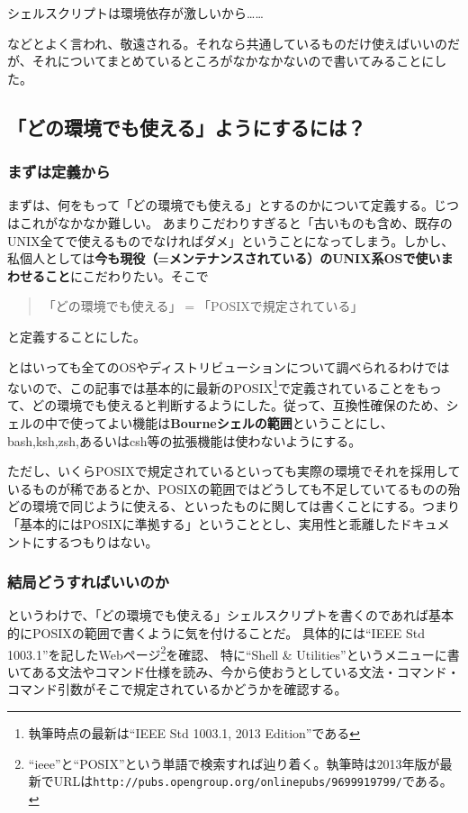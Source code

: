 \noindent
$\!\!\!\!\!$
\begin{grshfboxit}{160.0mm}
	シェルスクリプトは環境依存が激しいから……
\end{grshfboxit}

\noindent
などとよく言われ、敬遠される。それなら共通しているものだけ使えばいいのだが、それについてまとめているところがなかなかないので書いてみることにした。

\subsection*{「どの環境でも使える」ようにするには？}

\subsubsection*{まずは定義から}

まずは、何をもって「どの環境でも使える」とするのかについて定義する。じつはこれがなかなか難しい。
あまりこだわりすぎると「古いものも含め、既存のUNIX全てで使えるものでなければダメ」ということになってしまう。しかし、私個人としては\textbf{今も現役（=メンテナンスされている）のUNIX系OSで使いまわせること}にこだわりたい。そこで

\begin{quote}
  「どの環境でも使える」$=$「POSIXで規定されている」
\end{quote}

\noindent
と定義することにした。

とはいっても全てのOSやディストリビューションについて調べられるわけではないので、この記事では基本的に最新のPOSIX\footnote{執筆時点の最新は``IEEE Std 1003.1, 2013 Edition''である}で定義されていることをもって、どの環境でも使えると判断するようにした。従って、互換性確保のため、シェルの中で使ってよい機能は\textbf{Bourneシェルの範囲}ということにし、bash,ksh,zsh,あるいはcsh等の拡張機能は使わないようにする。

ただし、いくらPOSIXで規定されているといっても実際の環境でそれを採用しているものが稀であるとか、POSIXの範囲ではどうしても不足していてるものの殆どの環境で同じように使える、といったものに関しては書くことにする。つまり「基本的にはPOSIXに準拠する」ということとし、実用性と乖離したドキュメントにするつもりはない。

\subsubsection*{結局どうすればいいのか}

というわけで、「どの環境でも使える」シェルスクリプトを書くのであれば基本的にPOSIXの範囲で書くように気を付けることだ。
具体的には``IEEE Std 1003.1''を記したWebページ\footnote{``ieee''と``POSIX''という単語で検索すれば辿り着く。執筆時は2013年版が最新でURLは\verb|http://pubs.opengroup.org/onlinepubs/9699919799/|である。}を確認、
特に``Shell \& Utilities''というメニューに書いてある文法やコマンド仕様を読み、今から使おうとしている文法・コマンド・コマンド引数がそこで規定されているかどうかを確認する。

